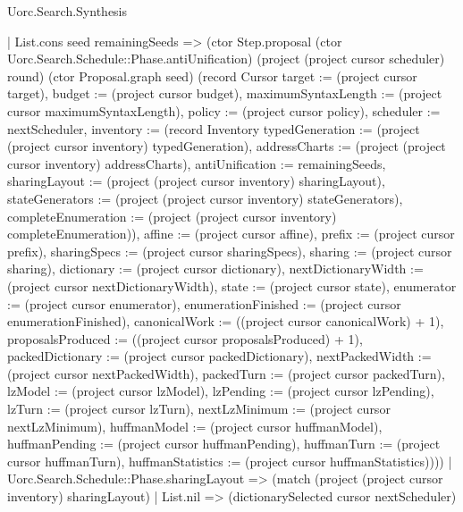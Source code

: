 \begin{lexlean}{Uorc.Search.Synthesis}
\begin{semanticmodule}
{      | List.cons seed remainingSeeds => (ctor Step.proposal (ctor Uorc.Search.Schedule::Phase.antiUnification) (project (project cursor scheduler) round) (ctor Proposal.graph seed) (record Cursor {target := (project cursor target), budget := (project cursor budget), maximumSyntaxLength := (project cursor maximumSyntaxLength), policy := (project cursor policy), scheduler := nextScheduler, inventory := (record Inventory {typedGeneration := (project (project cursor inventory) typedGeneration), addressCharts := (project (project cursor inventory) addressCharts), antiUnification := remainingSeeds, sharingLayout := (project (project cursor inventory) sharingLayout), stateGenerators := (project (project cursor inventory) stateGenerators), completeEnumeration := (project (project cursor inventory) completeEnumeration)}), affine := (project cursor affine), prefix := (project cursor prefix), sharingSpecs := (project cursor sharingSpecs), sharing := (project cursor sharing), dictionary := (project cursor dictionary), nextDictionaryWidth := (project cursor nextDictionaryWidth), state := (project cursor state), enumerator := (project cursor enumerator), enumerationFinished := (project cursor enumerationFinished), canonicalWork := ((project cursor canonicalWork) + 1), proposalsProduced := ((project cursor proposalsProduced) + 1), packedDictionary := (project cursor packedDictionary), nextPackedWidth := (project cursor nextPackedWidth), packedTurn := (project cursor packedTurn), lzModel := (project cursor lzModel), lzPending := (project cursor lzPending), lzTurn := (project cursor lzTurn), nextLzMinimum := (project cursor nextLzMinimum), huffmanModel := (project cursor huffmanModel), huffmanPending := (project cursor huffmanPending), huffmanTurn := (project cursor huffmanTurn), huffmanStatistics := (project cursor huffmanStatistics)})))
    | Uorc.Search.Schedule::Phase.sharingLayout => (match (project (project cursor inventory) sharingLayout)
      | List.nil => (dictionarySelected cursor nextScheduler)
}
\end{semanticmodule}
\end{lexlean}
